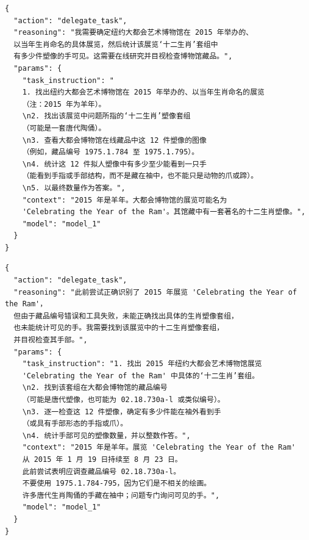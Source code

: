 \begin{tcolorbox}[
  title={\textbf{\small 尝试 1 - 主智能体决策}},
  boxrule=1pt,
  arc=0mm,
  colback=gray!5,
  colframe=gray!70,
  breakable,
  before skip=10pt,
  after skip=10pt,
  pad at break=2mm,
  parbox=false
]
\begin{verbatim}
{
  "action": "delegate_task",
  "reasoning": "我需要确定纽约大都会艺术博物馆在 2015 年举办的、
  以当年生肖命名的具体展览，然后统计该展览‘十二生肖’套组中
  有多少件塑像的手可见。这需要在线研究并目视检查博物馆藏品。",
  "params": {
    "task_instruction": "
    1. 找出纽约大都会艺术博物馆在 2015 年举办的、以当年生肖命名的展览
    （注：2015 年为羊年）。
    \n2. 找出该展览中问题所指的‘十二生肖’塑像套组
    （可能是一套唐代陶俑）。
    \n3. 查看大都会博物馆在线藏品中这 12 件塑像的图像
    （例如，藏品编号 1975.1.784 至 1975.1.795）。
    \n4. 统计这 12 件拟人塑像中有多少至少能看到一只手
    （能看到手指或手部结构，而不是藏在袖中，也不能只是动物的爪或蹄）。
    \n5. 以最终数量作为答案。",
    "context": "2015 年是羊年。大都会博物馆的展览可能名为
    'Celebrating the Year of the Ram'。其馆藏中有一套著名的十二生肖塑像。",
    "model": "model_1"
  }
}
\end{verbatim}
\end{tcolorbox}

\begin{tcolorbox}[
  title={\textbf{\small 尝试 2 - 主智能体决策}},
  boxrule=1pt,
  arc=0mm,
  colback=gray!5,
  colframe=gray!70,
  breakable,
  before skip=10pt,
  after skip=10pt,
  pad at break=2mm,
  parbox=false
]
\begin{verbatim}
{
  "action": "delegate_task",
  "reasoning": "此前尝试正确识别了 2015 年展览 'Celebrating the Year of the Ram'，
  但由于藏品编号错误和工具失败，未能正确找出具体的生肖塑像套组，
  也未能统计可见的手。我需要找到该展览中的十二生肖塑像套组，
  并目视检查其手部。",
  "params": {
    "task_instruction": "1. 找出 2015 年纽约大都会艺术博物馆展览
    'Celebrating the Year of the Ram' 中具体的‘十二生肖’套组。
    \n2. 找到该套组在大都会博物馆的藏品编号
    （可能是唐代塑像，也可能为 02.18.730a-l 或类似编号）。
    \n3. 逐一检查这 12 件塑像，确定有多少件能在袖外看到手
    （或具有手部形态的手指或爪）。
    \n4. 统计手部可见的塑像数量，并以整数作答。",
    "context": "2015 年是羊年。展览 'Celebrating the Year of the Ram'
    从 2015 年 1 月 19 日持续至 8 月 23 日。
    此前尝试表明应调查藏品编号 02.18.730a-l。
    不要使用 1975.1.784-795，因为它们是不相关的绘画。
    许多唐代生肖陶俑的手藏在袖中；问题专门询问可见的手。",
    "model": "model_1"
  }
}
\end{verbatim}
\end{tcolorbox}

